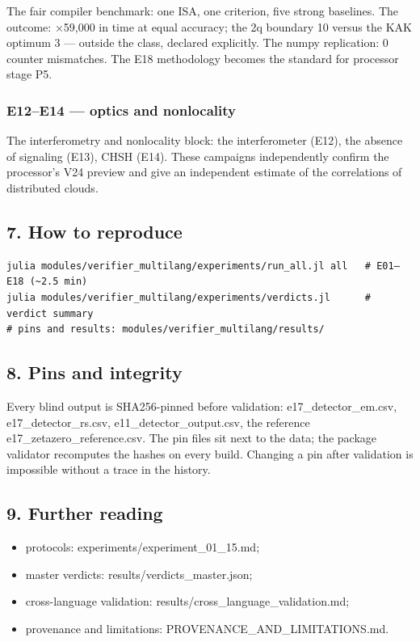 \documentclass[11pt,a4paper]{article}
\begin{document}
The fair compiler benchmark: one ISA, one criterion, five strong baselines. The outcome: ×59,000 in time at equal accuracy; the 2q boundary 10 versus the KAK optimum 3 — outside the class, declared explicitly. The numpy replication: 0 counter mismatches. The E18 methodology becomes the standard for processor stage P5.

\subsubsection{E12–E14 — optics and nonlocality}

The interferometry and nonlocality block: the interferometer (E12), the absence of signaling (E13), CHSH (E14). These campaigns independently confirm the processor's V24 preview and give an independent estimate of the correlations of distributed clouds.

\subsection{7. How to reproduce}

\begin{verbatim}
julia modules/verifier_multilang/experiments/run_all.jl all   # E01–E18 (~2.5 min)
julia modules/verifier_multilang/experiments/verdicts.jl      # verdict summary
# pins and results: modules/verifier_multilang/results/
\end{verbatim}

\subsection{8. Pins and integrity}

Every blind output is SHA256-pinned before validation: e17\_detector\_em.csv, e17\_detector\_rs.csv, e11\_detector\_output.csv, the reference e17\_zetazero\_reference.csv. The pin files sit next to the data; the package validator recomputes the hashes on every build. Changing a pin after validation is impossible without a trace in the history.

\subsection{9. Further reading}

\begin{itemize}
  \item protocols: experiments/experiment\_01\_15.md;
  \item master verdicts: results/verdicts\_master.json;
  \item cross-language validation: results/cross\_language\_validation.md;
  \item provenance and limitations: PROVENANCE\_AND\_LIMITATIONS.md.
\end{itemize}
\end{document}
